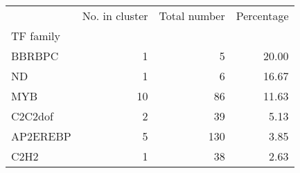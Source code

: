 \begin{tabular}{lrrr}
\toprule
{} &  No. in cluster &  Total number &  Percentage \\
TF family &                 &               &             \\
\midrule
BBRBPC    &               1 &             5 &       20.00 \\
ND        &               1 &             6 &       16.67 \\
MYB       &              10 &            86 &       11.63 \\
C2C2dof   &               2 &            39 &        5.13 \\
AP2EREBP  &               5 &           130 &        3.85 \\
C2H2      &               1 &            38 &        2.63 \\
\bottomrule
\end{tabular}
